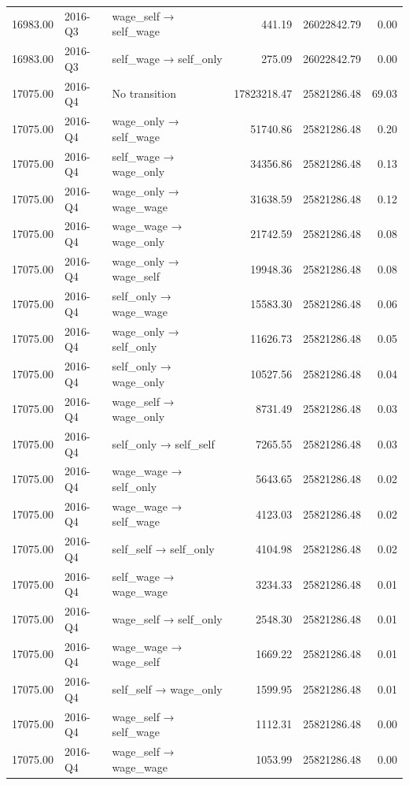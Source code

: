 \begin{table}[ht]
{\begin{tabular}{rllrrr}
  16983.00 & 2016-Q3 & wage\_self → self\_wage & 441.19 & 26022842.79 & 0.00 \\ 
  16983.00 & 2016-Q3 & self\_wage → self\_only & 275.09 & 26022842.79 & 0.00 \\ 
  17075.00 & 2016-Q4 & No transition & 17823218.47 & 25821286.48 & 69.03 \\ 
  17075.00 & 2016-Q4 & wage\_only → self\_wage & 51740.86 & 25821286.48 & 0.20 \\ 
  17075.00 & 2016-Q4 & self\_wage → wage\_only & 34356.86 & 25821286.48 & 0.13 \\ 
  17075.00 & 2016-Q4 & wage\_only → wage\_wage & 31638.59 & 25821286.48 & 0.12 \\ 
  17075.00 & 2016-Q4 & wage\_wage → wage\_only & 21742.59 & 25821286.48 & 0.08 \\ 
  17075.00 & 2016-Q4 & wage\_only → wage\_self & 19948.36 & 25821286.48 & 0.08 \\ 
  17075.00 & 2016-Q4 & self\_only → wage\_wage & 15583.30 & 25821286.48 & 0.06 \\ 
  17075.00 & 2016-Q4 & wage\_only → self\_only & 11626.73 & 25821286.48 & 0.05 \\ 
  17075.00 & 2016-Q4 & self\_only → wage\_only & 10527.56 & 25821286.48 & 0.04 \\ 
  17075.00 & 2016-Q4 & wage\_self → wage\_only & 8731.49 & 25821286.48 & 0.03 \\ 
  17075.00 & 2016-Q4 & self\_only → self\_self & 7265.55 & 25821286.48 & 0.03 \\ 
  17075.00 & 2016-Q4 & wage\_wage → self\_only & 5643.65 & 25821286.48 & 0.02 \\ 
  17075.00 & 2016-Q4 & wage\_wage → self\_wage & 4123.03 & 25821286.48 & 0.02 \\ 
  17075.00 & 2016-Q4 & self\_self → self\_only & 4104.98 & 25821286.48 & 0.02 \\ 
  17075.00 & 2016-Q4 & self\_wage → wage\_wage & 3234.33 & 25821286.48 & 0.01 \\ 
  17075.00 & 2016-Q4 & wage\_self → self\_only & 2548.30 & 25821286.48 & 0.01 \\ 
  17075.00 & 2016-Q4 & wage\_wage → wage\_self & 1669.22 & 25821286.48 & 0.01 \\ 
  17075.00 & 2016-Q4 & self\_self → wage\_only & 1599.95 & 25821286.48 & 0.01 \\ 
  17075.00 & 2016-Q4 & wage\_self → self\_wage & 1112.31 & 25821286.48 & 0.00 \\ 
  17075.00 & 2016-Q4 & wage\_self → wage\_wage & 1053.99 & 25821286.48 & 0.00 \\ 

\end{tabular}}
\end{table}
